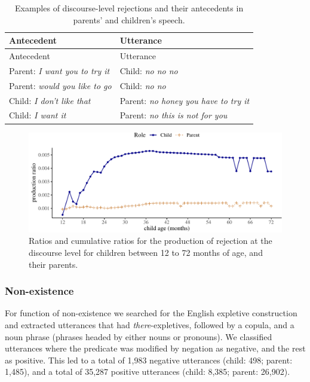 \documentclass[
  english,
  man,floatsintext]{apa6}
\begin{document}
\begin{longtable}[]{@{}ll@{}}
\caption{\label{tab:disreject} Examples of discourse-level rejections and their antecedents in parents' and children's speech.}\tabularnewline
\toprule
Antecedent & Utterance \\
\midrule
\endfirsthead
\toprule
Antecedent & Utterance \\
\midrule
\endhead
Parent: \emph{I want you to try it} & Child: \emph{no no no} \\
Parent: \emph{would you like to go} & Child: \emph{no no} \\
Child: \emph{I don't like that} & Parent: \emph{no honey you have to try it} \\
Child: \emph{I want it} & Parent: \emph{no this is not for you} \\
\bottomrule
\end{longtable}

\begin{figure}[H]

{\centering \includegraphics{neg_construction_article_files/figure-latex/emotiondiscourse-1} 

}

\caption{Ratios and cumulative ratios for the production of rejection at the discourse level for children between 12 to 72 months of age, and their parents.}\label{fig:emotiondiscourse}
\end{figure}

\hypertarget{non-existence}{%
\subsubsection{Non-existence}\label{non-existence}}

For function of non-existence we searched for the English expletive construction and extracted utterances that had \emph{there}-expletives, followed by a copula, and a noun phrase (phrases headed by either nouns or pronouns). We classified utterances where the predicate was modified by negation as negative, and the rest as positive. This led to a total of 1,983 negative utterances (child: 498; parent: 1,485), and a total of 35,287 positive utterances (child: 8,385; parent: 26,902).
\end{document}
